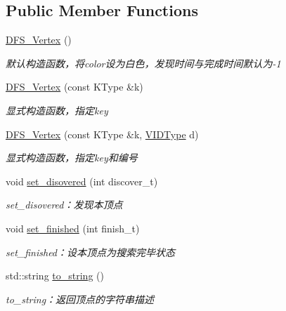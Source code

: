 \subsection*{Public Member Functions}
\begin{DoxyCompactItemize}
\item 
\hyperlink{struct_introduction_to_algorithm_1_1_graph_algorithm_1_1_d_f_s___vertex_a91c4d3427c469cbb16459f6a34ac1307}{D\+F\+S\+\_\+\+Vertex} ()
\begin{DoxyCompactList}\small\item\em 默认构造函数，将{\ttfamily color}设为白色，发现时间与完成时间默认为-\/1 \end{DoxyCompactList}\item 
\hyperlink{struct_introduction_to_algorithm_1_1_graph_algorithm_1_1_d_f_s___vertex_a9f93db7ee64b35d820b8cedeae0e3621}{D\+F\+S\+\_\+\+Vertex} (const K\+Type \&k)
\begin{DoxyCompactList}\small\item\em 显式构造函数，指定{\ttfamily key} \end{DoxyCompactList}\item 
\hyperlink{struct_introduction_to_algorithm_1_1_graph_algorithm_1_1_d_f_s___vertex_a69dbf0c9db688cc6d2783f707da052df}{D\+F\+S\+\_\+\+Vertex} (const K\+Type \&k, \hyperlink{struct_introduction_to_algorithm_1_1_graph_algorithm_1_1_d_f_s___vertex_aeb115a10366eb62880d2672d4e1da7a1}{V\+I\+D\+Type} d)
\begin{DoxyCompactList}\small\item\em 显式构造函数，指定{\ttfamily key}和编号 \end{DoxyCompactList}\item 
void \hyperlink{struct_introduction_to_algorithm_1_1_graph_algorithm_1_1_d_f_s___vertex_ab1969489b2a5d73191da5664b127226d}{set\+\_\+disovered} (int discover\+\_\+t)
\begin{DoxyCompactList}\small\item\em set\+\_\+disovered：发现本顶点 \end{DoxyCompactList}\item 
void \hyperlink{struct_introduction_to_algorithm_1_1_graph_algorithm_1_1_d_f_s___vertex_a07353127c56aabb5c411ca7f4d28c553}{set\+\_\+finished} (int finish\+\_\+t)
\begin{DoxyCompactList}\small\item\em set\+\_\+finished：设本顶点为搜索完毕状态 \end{DoxyCompactList}\item 
std\+::string \hyperlink{struct_introduction_to_algorithm_1_1_graph_algorithm_1_1_d_f_s___vertex_a9a8a8c8b2ad1c3b6e90d2c2efb7cbe2e}{to\+\_\+string} ()
\begin{DoxyCompactList}\small\item\em to\+\_\+string：返回顶点的字符串描述 \end{DoxyCompactList}\end{DoxyCompactItemize}
